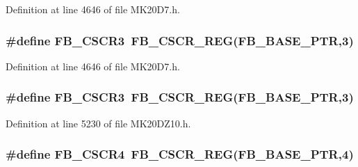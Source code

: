 Definition at line 4646 of file M\+K20\+D7.\+h.

\subsubsection[{\texorpdfstring{F\+B\+\_\+\+C\+S\+C\+R3}{FB_CSCR3}}]{\setlength{\rightskip}{0pt plus 5cm}\#define F\+B\+\_\+\+C\+S\+C\+R3~{\bf F\+B\+\_\+\+C\+S\+C\+R\+\_\+\+R\+EG}({\bf F\+B\+\_\+\+B\+A\+S\+E\+\_\+\+P\+TR},3)}\hypertarget{group___f_b___register___accessor___macros_gab8dddf42dec6c5d0c457ea947b335e78}{}\label{group___f_b___register___accessor___macros_gab8dddf42dec6c5d0c457ea947b335e78}


Definition at line 4646 of file M\+K20\+D7.\+h.

\subsubsection[{\texorpdfstring{F\+B\+\_\+\+C\+S\+C\+R3}{FB_CSCR3}}]{\setlength{\rightskip}{0pt plus 5cm}\#define F\+B\+\_\+\+C\+S\+C\+R3~{\bf F\+B\+\_\+\+C\+S\+C\+R\+\_\+\+R\+EG}({\bf F\+B\+\_\+\+B\+A\+S\+E\+\_\+\+P\+TR},3)}\hypertarget{group___f_b___register___accessor___macros_gab8dddf42dec6c5d0c457ea947b335e78}{}\label{group___f_b___register___accessor___macros_gab8dddf42dec6c5d0c457ea947b335e78}


Definition at line 5230 of file M\+K20\+D\+Z10.\+h.

\subsubsection[{\texorpdfstring{F\+B\+\_\+\+C\+S\+C\+R4}{FB_CSCR4}}]{\setlength{\rightskip}{0pt plus 5cm}\#define F\+B\+\_\+\+C\+S\+C\+R4~{\bf F\+B\+\_\+\+C\+S\+C\+R\+\_\+\+R\+EG}({\bf F\+B\+\_\+\+B\+A\+S\+E\+\_\+\+P\+TR},4)}\hypertarget{group___f_b___register___accessor___macros_gab771a3e18c902983f93e07239d58e2fc}{}\label{group___f_b___register___accessor___macros_gab771a3e18c902983f93e07239d58e2fc}



